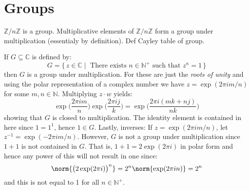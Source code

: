 \documentclass{article}                                                        %
\begin{document}
    \section{Groups}
        $\mathbb{Z}/n\mathbb{Z}$ is a group. Multiplicative elements of
        $\mathbb{Z}/n\mathbb{Z}$ form a group under multiplication (essentialy
        by definition). Def Cayley table of group.
        \begin{example}
            If $G\subseteq\mathbb{C}$ is defined by:
            \begin{equation}
                G=\{\,z\in\mathbb{C}\;|\;
                    \textrm{ There exists }n\in\mathbb{N}^{+}
                    \textrm{ such that }z^{n}=1\,\}
            \end{equation}
            then $G$ is a group under multiplication. For these are just the
            \textit{roots of unity} and using the polar representation of a
            complex number we have $z=\exp(2\pi{i}m/n)$ for some
            $m,n\in\mathbb{N}$. Multiplying $z\cdot{w}$ yields:
            \begin{equation}
                \exp\Big(\frac{2\pi{i}m}{n}\Big)
                    \exp\Big(\frac{2\pi{i}j}{k}\Big)
                =\exp\Big(\frac{2\pi{i}(mk+nj)}{nk}\Big)
            \end{equation}
            showing that $G$ is closed to multiplication. The identity element
            is contained in here since $1=1^{1}$, hence $1\in{G}$. Lastly,
            inverses: If $z=\exp(2\pi{i}m/n)$, let
            $z^{\minus{1}}=\exp(\minus{2}\pi{i}m/n)$. However, $G$ is not a
            group under multiplication since $1+1$ is not contained in $G$.
            That is, $1+1=2\exp(2\pi{i})$ in polar form and hence any power of
            this will not result in one since:
            \begin{equation}
                \norm{\big(2\exp(2\pi{i})\big)^{n}}
                =2^{n}\norm{\exp(2\pi{i}n)}=2^{n}
            \end{equation}
            and this is not equal to 1 for all $n\in\mathbb{N}^{+}$.
        \end{example}
\end{document}
